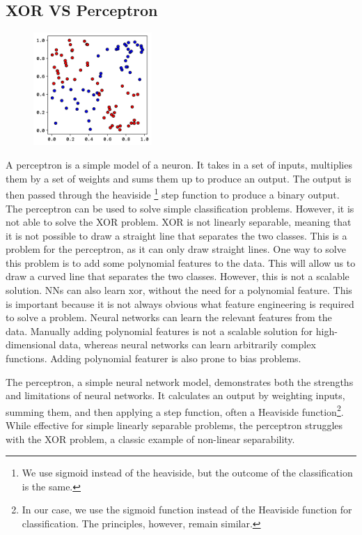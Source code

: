 \documentclass[twoside,11pt]{report}
\begin{document}
\subsection*{XOR VS Perceptron}
\label{app:xor}

    \begin{figure}
        \begin{center}
            \includegraphics[width=0.4\textwidth]{../runsAndFigures/xor.png}
        \end{center}
        \caption{}\label{fig:xor_data}
    \end{figure}

    A perceptron is a simple model of a neuron. It takes in a set of inputs, multiplies them by a set of weights 
    and sums them up to produce an output. The output is then passed through the heaviside
    \footnote{We use sigmoid instead of the heaviside, but the outcome of the classification is the same.}
    step function to produce
    a binary output. The perceptron can be used to solve simple classification problems. However, it is not able to
    solve the XOR problem. XOR is not linearly separable, meaning that it is not possible to draw a straight line
    that separates the two classes. This is a problem for the perceptron, as it can only draw straight lines.
    One way to solve this problem is to add some polynomial features to the data. 
    This will allow us to draw a curved line that separates the two classes. However, this is not a scalable solution.
    NNs can also learn xor, without the need for a polynomial feature. This is important because it is not 
    always obvious what feature engineering is required to solve a problem. Neural networks can learn the 
    relevant 
    features from the data. Manually adding polynomial features is not a scalable solution for 
    high-dimensional data,
    whereas neural networks can learn arbitrarily complex functions. Adding polynomial featurer 
    is also prone to 
    bias problems.

The perceptron, a simple neural network model, demonstrates both the strengths and limitations of neural networks. It calculates an output by weighting inputs, summing them, and then applying a step function, often a Heaviside function\footnote{In our case, we use the sigmoid function instead of the Heaviside function for classification. The principles, however, remain similar.}. While effective for simple linearly separable problems, the perceptron struggles with the XOR problem, a classic example of non-linear separability.
\end{document}
